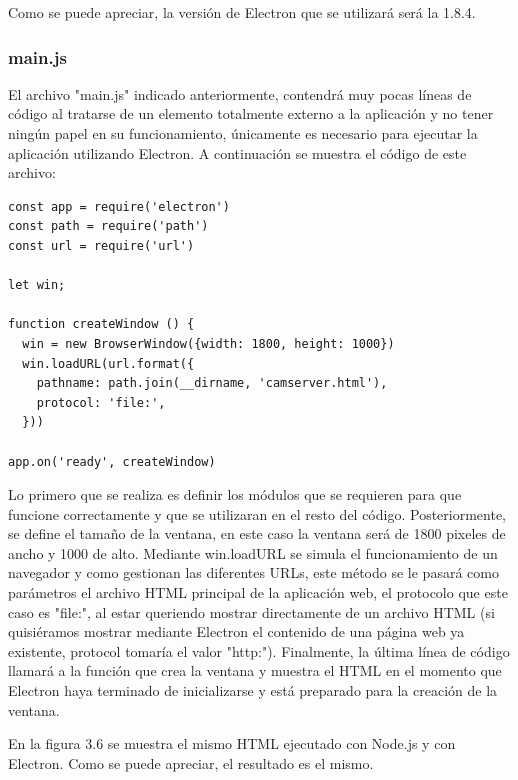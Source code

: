 Como se puede apreciar, la versión de Electron que se utilizará será la 1.8.4.

\subsubsection{main.js}
El archivo "main.js" indicado anteriormente, contendrá muy pocas líneas de código al tratarse de un elemento totalmente externo a la aplicación y no tener ningún papel en su funcionamiento, únicamente es necesario para ejecutar la aplicación utilizando Electron. A continuación se muestra el código de este archivo:

\begin{lstlisting}[frame=single]
const app = require('electron')
const path = require('path')
const url = require('url')

let win;

function createWindow () {
  win = new BrowserWindow({width: 1800, height: 1000})
  win.loadURL(url.format({
    pathname: path.join(__dirname, 'camserver.html'),
    protocol: 'file:',
  }))
  
app.on('ready', createWindow)

\end{lstlisting}

Lo primero que se realiza es definir los módulos que se requieren para que funcione correctamente y que se utilizaran en el resto del código. Posteriormente, se define el tamaño de la ventana, en este caso la ventana será de 1800 pixeles de ancho y 1000 de alto. Mediante win.loadURL se simula el funcionamiento de un navegador y como gestionan las diferentes URLs, este método se le pasará como parámetros el archivo HTML principal de la aplicación web, el protocolo que este caso es "file:", al estar queriendo mostrar directamente de un archivo HTML (si quisiéramos mostrar mediante Electron el contenido de una página web ya existente, protocol tomaría el valor "http:"). Finalmente, la última línea de código llamará a la función que crea la ventana y muestra el HTML en el momento que Electron haya terminado de inicializarse y está preparado para la creación de la ventana.


En la figura 3.6 se muestra el mismo HTML ejecutado con Node.js y con Electron. Como se puede apreciar, el resultado es el mismo.


